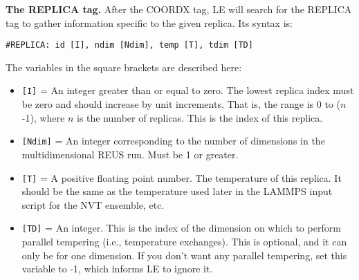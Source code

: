 \documentclass[10pt]{article}
\begin{document}
\textbf{The REPLICA tag.}
After the COORDX tag, LE will search for the REPLICA tag to gather information specific
to the given replica. Its syntax is:
\begin{verbatim}
#REPLICA: id [I], ndim [Ndim], temp [T], tdim [TD]
\end{verbatim}
The variables in the square brackets are described here:
\begin{itemize}
\item	\texttt{[I]} = An integer greater than or equal to zero. The lowest
		replica index must be zero and should increase by unit increments. That is,
		the range is 0 to ($n$-1), where $n$ is the number of replicas. This is
		the index of this replica.
\item	\texttt{[Ndim]} = An integer corresponding to the number of dimensions
		in the multidimensional REUS run. Must be 1 or greater.
\item	\texttt{[T]} = A positive floating point number. The temperature of this replica.
		It should be the same as the temperature used later in the LAMMPS input script
		for the NVT ensemble, etc.
\item	\texttt{[TD]} = An integer. This is the index of the dimension on which to perform
		parallel tempering (i.e., temperature exchanges). This is optional, and it can only be
		for one dimension. If you don't want any parallel tempering, set this variable to -1,
		which informs LE to ignore it.
\end{itemize}
\end{document}
